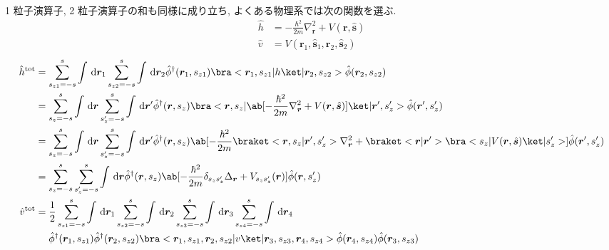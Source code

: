 \documentclass[uplatex,dvipdfmx,a4paper,11pt]{jlreq}
\newcommand{\rr}{\bm{r}}
\renewcommand{\ss}{\bm{s}}
\numberwithin{equation}{section}
\theoremstyle{definition}
\begin{document}
\begin{example}[Q21-87, Q21-88, Q21-89(i)(ii), Q21-90, Q21-91(i)(ii)(iii)(iv), Q21-92]
  1 粒子演算子, 2 粒子演算子の和も同様に成り立ち, よくある物理系では次の関数を選ぶ.
  \begin{align}
    \hat{h} & = - \frac{\hbar^2}{2m}\nabla_{\rr}^2 + V(\rr, \hat{\ss}) \\
    \hat{v} & = V(\rr_1, \hat{\ss}_1, \rr_2, \hat{\ss}_2)
  \end{align}
  \begin{align}
    \hat{h}^{\mathrm{tot}} & = \sum_{s_{z1} = -s}^s\int\dl{\rr_1}\sum_{s_{z2} = -s}^s\int\dl{\rr_2}\hat{\phi}^\dagger(\rr_1, s_{z1})\bra<\rr_1,s_{z1}|h\ket|\rr_2,s_{z2}>\hat{\phi}(\rr_2, s_{z2})                                                                                                                 \\
                           & = \sum_{s_z = -s}^s\int\dl{\rr}\sum_{s_z' = -s}^s\int\dl{\rr'}\hat{\phi}^\dagger(\rr, s_z)\bra<\rr,s_z|\ab[-\frac{\hbar^2}{2m}\nabla_{\rr}^2 + V(\rr, \hat{\ss})]\ket|\rr',s_z'>\hat{\phi}(\rr', s_z')                                                                                \\
                           & = \sum_{s_z = -s}^s\int\dl{\rr}\sum_{s_z' = -s}^s\int\dl{\rr'}\hat{\phi}^\dagger(\rr, s_z)\ab[-\frac{\hbar^2}{2m}\braket<\rr,s_z|\rr',s_z'>\nabla_{\rr}^2 + \braket<\rr|\rr'>\bra<s_z|V(\rr, \hat{\ss})\ket|s_z'>]\hat{\phi}(\rr', s_z')                                              \\
                           & = \sum_{s_z = -s}^{s}\sum_{s_z' = -s}^{s}\int\dl{\rr}\hat{\phi}^\dagger(\rr, s_z)\ab[-\frac{\hbar^2}{2m}\delta_{s_zs_z'}\Delta_{\rr} + V_{s_zs_z'}(\rr)]\hat{\phi}(\rr, s_z')                                                                                                         \\
    \hat{v}^{\mathrm{tot}} & = \frac{1}{2}\sum_{s_{z1} = -s}^s\int\dl{\rr_1}\sum_{s_{z2} = -s}^s\int\dl{\rr_2}\sum_{s_{z3} = -s}^s\int\dl{\rr_3}\sum_{s_{z4} = -s}^s\int\dl{\rr_4}                                                                                                                                 \\
                           & \quad\ \hat{\phi}^\dagger(\rr_1, s_{z1})\hat{\phi}^\dagger(\rr_2, s_{z2})\bra<\rr_1,s_{z1},\rr_2,s_{z2}|v\ket|\rr_3,s_{z3},\rr_4,s_{z4}>\hat{\phi}(\rr_4, s_{z4})\hat{\phi}(\rr_3, s_{z3})                                                                                            \\

\end{align}
\end{example}
\end{document}
